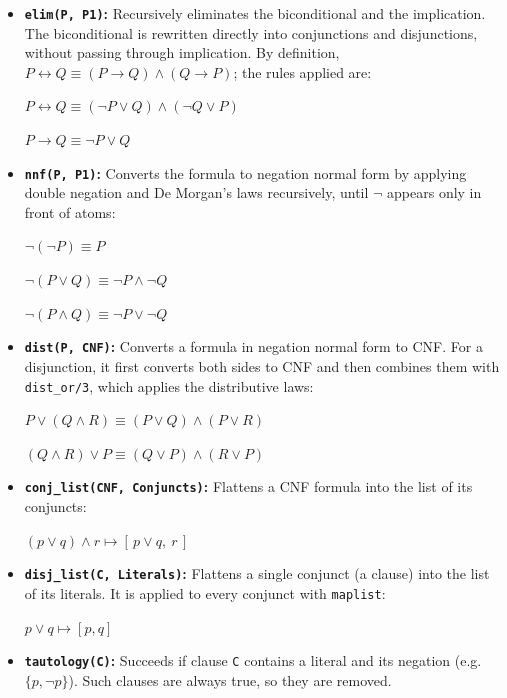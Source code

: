 \documentclass[11pt]{article}
\begin{document}
\begin{itemize}
    \item \textbf{\texttt{elim(P, P1)}:} Recursively eliminates the biconditional and
    the implication. The biconditional is rewritten directly into conjunctions and
    disjunctions, without passing through implication. By definition,
    $P \leftrightarrow Q \equiv (P \rightarrow Q) \land (Q \rightarrow P)$;
    the rules applied are:

    $P \leftrightarrow Q \equiv (\neg P \lor Q) \land (\neg Q \lor P)$

    $P \rightarrow Q \equiv \neg P \lor Q$

    \item \textbf{\texttt{nnf(P, P1)}:} Converts the formula to negation normal form
    by applying double negation and De Morgan's laws recursively, until $\neg$
    appears only in front of atoms:

    $\neg(\neg P) \equiv P$

    $\neg(P \lor Q) \equiv \neg P \land \neg Q$

    $\neg(P \land Q) \equiv \neg P \lor \neg Q$

    \item \textbf{\texttt{dist(P, CNF)}:} Converts a formula in negation normal form
    to CNF. For a disjunction, it first converts both sides to CNF and then
    combines them with \texttt{dist\_or/3}, which applies the distributive laws:

    $P \lor (Q \land R) \equiv (P \lor Q) \land (P \lor R)$

    $(Q \land R) \lor P \equiv (Q \lor P) \land (R \lor P)$

    \item \textbf{\texttt{conj\_list(CNF, Conjuncts)}:} Flattens a CNF formula into
    the list of its conjuncts:

    $(p \lor q) \land r \mapsto [\,p \lor q,\ r\,]$

    \item \textbf{\texttt{disj\_list(C, Literals)}:} Flattens a single conjunct (a
    clause) into the list of its literals. It is applied to every conjunct with
    \texttt{maplist}:

    $p \lor q \mapsto [p, q]$

    \item \textbf{\texttt{tautology(C)}:} Succeeds if clause \texttt{C} contains a
    literal and its negation (e.g.\ $\{p, \neg p\}$). Such clauses are always
    true, so they are removed.
\end{itemize}
\end{document}

